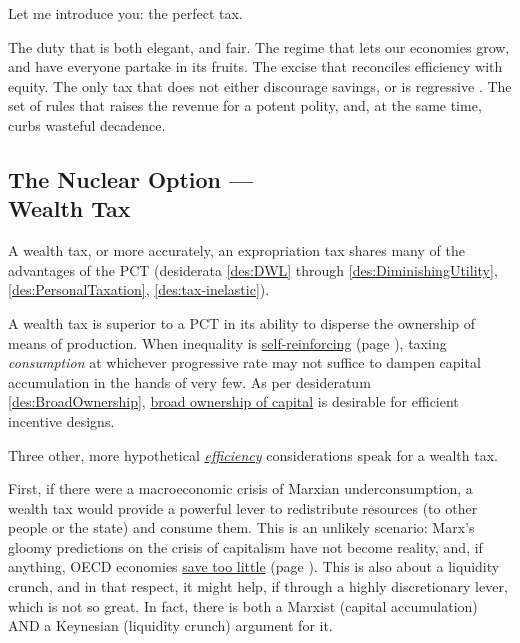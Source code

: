 Let me introduce you:
the perfect tax.

The duty that is both elegant, and fair.
The regime that lets our economies grow, and have everyone partake in its fruits.
The excise that reconciles efficiency with equity.
The only tax that does not either discourage savings, or is regressive \citep[2]{Seidman1997}.
The set of rules that raises the revenue for a potent polity, and, at the same time, curbs wasteful decadence.

\subsection[Wealth Tax]{The Nuclear Option ---\\Wealth Tax}
	\label{sec:ScoreWT}
A wealth tax, or more accurately, an expropriation tax shares many of the advantages of the PCT (desiderata \ref{des:DWL} through \ref{des:DiminishingUtility}, \ref{des:PersonalTaxation}, \ref{des:tax-inelastic}).

A wealth tax is superior to a PCT in its ability to disperse the ownership of means of production.
When inequality is \hyperref[sec:GovDynofIneq]{self-reinforcing} (page \pageref{sec:GovDynofIneq}), taxing \emph{consumption} at whichever progressive rate may not suffice to dampen capital accumulation in the hands of very few.
As per desideratum \ref{des:BroadOwnership}, \hyperref[des:BroadOwnership]{broad ownership of capital} is desirable for efficient incentive designs.

Three other, more hypothetical \hyperref[sec:Efficiency]{\emph{efficiency}} considerations speak for a wealth tax.

First, if there were a macroeconomic crisis of Marxian %
underconsumption, a wealth tax would provide a powerful lever to redistribute resources (to other people or the state) and consume them.
This is an unlikely scenario:
Marx's gloomy predictions on the crisis of capitalism have not become reality, and, if anything, OECD economies \hyperref[des:Savings]{save too little} (page \pageref{des:Savings}).
This is also about a liquidity crunch, and in that respect, it might help, if through a highly discretionary lever, which is not so great.
In fact, there is both a Marxist (capital accumulation) AND a Keynesian (liquidity crunch) argument for it.

